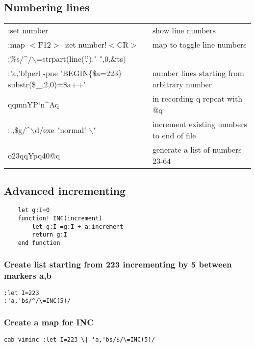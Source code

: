\subsection{Numbering lines}
\begin{center}
\begin{longtable}{l|l}
 :set number & show line numbers\\
 :map $<$F12$>$ :set number!$<$CR$>$ & map to toggle line numbers\\
 :\%s/\^{}/$\backslash$=strpart(line('.')." ",0,\&ts)\\
 :'a,'b!perl -pne 'BEGIN\{\$a=223\} substr(\$\_,2,0)=\$a++' & number lines starting from arbitrary number\\
 qqmnYP`n\^{}Aq & in recording q repeat with @q\\
 :.,\$g/\^{}$\backslash$d/exe "normal! $\backslash$" & increment existing numbers to end of file\\
 o23qqYpq40@q & generate a list of numbers 23-64
\end{longtable}
\end{center}

\subsection{Advanced incrementing}

\begin{verbatim}
    let g:I=0
    function! INC(increment)
        let g:I =g:I + a:increment
        return g:I
    end function
\end{verbatim}

\subsubsection{Create list starting from 223 incrementing by 5 between markers a,b}

\begin{verbatim}
:let I=223
:'a,'bs/^/\=INC(5)/
\end{verbatim}

\subsubsection{Create a map for INC}

\begin{verbatim}
cab viminc :let I=223 \| 'a,'bs/$/\=INC(5)/
\end{verbatim}

